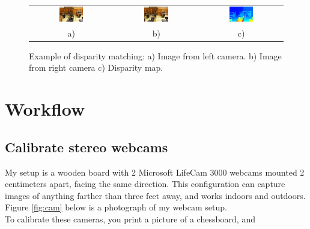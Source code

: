 \documentclass[11pt,fleqn]{article}
\begin{document}
\begin{figure}[!ht]
\centering
\setlength{}
\begin{tabular}{ccc}
\includegraphics[width=0.31\textwidth]{images/im0-600.jpg} &
\includegraphics[width=0.31\textwidth]{images/im1-600.jpg} &
\includegraphics[width=0.31\textwidth]{images/disp-600.jpg} \\[2pt]
a) & b) & c) \\
\end{tabular}
\caption[Example of disparity matching]{Example of disparity matching: a) Image from left camera. b) Image from right camera c) Disparity map.}
\label{fig:example1}
\end{figure}


\newpage
\section{Workflow}

\subsection{Calibrate stereo  webcams}

My setup is a wooden board with 2 Microsoft LifeCam 3000 webcams mounted 2 centimeters apart, facing the same direction. This configuration can capture images of anything farther than three feet away, and works indoors and outdoors. Figure \ref{fig:cam} below is a photograph of my webcam setup. \\[5pt]
%
To calibrate these cameras, you print a picture of a chessboard, and 
\end{document}
